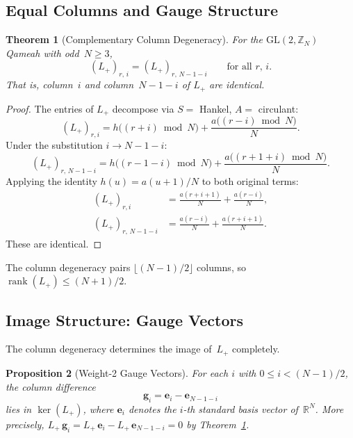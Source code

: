 \documentclass[aip,jmp,reprint,superscriptaddress,floatfix,nofootinbib]{revtex4-2}
\newtheorem{theorem}{Theorem}
\newtheorem{proposition}[theorem]{Proposition}
\theoremstyle{definition}
\theoremstyle{remark}
\newcommand{\ZN}{\mathbb{Z}_N}
\newcommand{\GL}{\mathrm{GL}}
\begin{document}
\subsection{Equal Columns and Gauge Structure}
\label{sec:brst:columns}

\begin{theorem}[Complementary Column
  Degeneracy]\label{thm:columns}
For the $\GL(2,\ZN)$ Qameah with odd~$N \ge 3$,
\begin{equation}\label{eq:col-degen}
(L_+)_{r,\,i} = (L_+)_{r,\,N-1-i}
  \qquad \text{for all } r,\, i.
\end{equation}
That is, column~$i$ and column~$N{-}1{-}i$ of $L_+$ are identical.
\end{theorem}

\begin{proof}
The entries of $L_+$ decompose via $S = $ Hankel, $A = $ circulant:
\begin{equation}
(L_+)_{r,i} = h\bigl((r{+}i) \bmod N\bigr)
  + \frac{a\bigl((r{-}i) \bmod N\bigr)}{N}.
\end{equation}
Under the substitution $i \to N{-}1{-}i$:
\begin{equation}
(L_+)_{r,\,N-1-i}
  = h\bigl((r{-}1{-}i) \bmod N\bigr)
  + \frac{a\bigl((r{+}1{+}i) \bmod N\bigr)}{N}.
\end{equation}
Applying the identity $h(u) = a(u{+}1)/N$ to both original terms:
\begin{align}
(L_+)_{r,i} &= \frac{a(r{+}i{+}1)}{N}
  + \frac{a(r{-}i)}{N}, \\
(L_+)_{r,\,N-1-i} &= \frac{a(r{-}i)}{N}
  + \frac{a(r{+}i{+}1)}{N}.
\end{align}
These are identical.
\end{proof}

The column degeneracy pairs $\lfloor (N{-}1)/2 \rfloor$ columns,
so $\operatorname{rank}(L_+) \le (N{+}1)/2$.

\subsection{Image Structure: Gauge Vectors}
\label{sec:brst:image}

The column degeneracy determines the image of~$L_+$ completely.

\begin{proposition}[Weight-2 Gauge Vectors]\label{prop:gauge}
For each $i$ with $0 \le i < (N{-}1)/2$, the column
difference
\begin{equation}\label{eq:gauge-vec}
\mathbf{g}_i = \mathbf{e}_i - \mathbf{e}_{N-1-i}
\end{equation}
lies in $\ker(L_+)$, where $\mathbf{e}_i$ denotes the $i$-th
standard basis vector of~$\mathbb{R}^N$.  More precisely,
$L_+\, \mathbf{g}_i = L_+\, \mathbf{e}_i - L_+\, \mathbf{e}_{N-1-i}
= 0$ by Theorem~\ref{thm:columns}.
\end{proposition}
\end{document}
